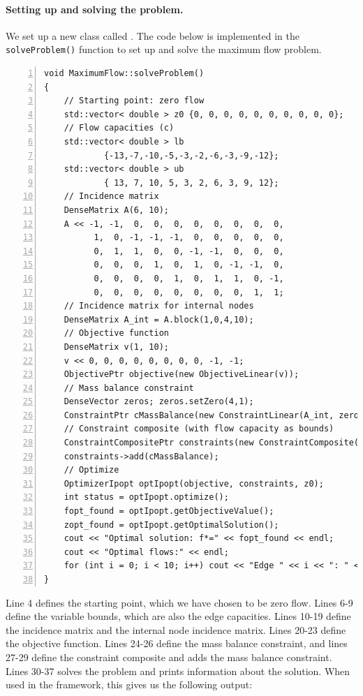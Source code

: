 \paragraph{Setting up and solving the problem.} We set up a new  class called . The code below is implemented in the \texttt{solveProblem()} function to set up and solve the maximum flow problem.
\begin{lstlisting}[numbers=left]
void MaximumFlow::solveProblem()
{
    // Starting point: zero flow
    std::vector< double > z0 {0, 0, 0, 0, 0, 0, 0, 0, 0, 0};
    // Flow capacities (c)
    std::vector< double > lb
    		{-13,-7,-10,-5,-3,-2,-6,-3,-9,-12};
    std::vector< double > ub
    		{ 13, 7, 10, 5, 3, 2, 6, 3, 9, 12};
    // Incidence matrix
    DenseMatrix A(6, 10);
    A << -1, -1,  0,  0,  0,  0,  0,  0,  0,  0,
          1,  0, -1, -1, -1,  0,  0,  0,  0,  0,
          0,  1,  1,  0,  0, -1, -1,  0,  0,  0,
          0,  0,  0,  1,  0,  1,  0, -1, -1,  0,
          0,  0,  0,  0,  1,  0,  1,  1,  0, -1,
          0,  0,  0,  0,  0,  0,  0,  0,  1,  1;
    // Incidence matrix for internal nodes
    DenseMatrix A_int = A.block(1,0,4,10);
    // Objective function
    DenseMatrix v(1, 10);
    v << 0, 0, 0, 0, 0, 0, 0, 0, -1, -1;
    ObjectivePtr objective(new ObjectiveLinear(v));
    // Mass balance constraint
    DenseVector zeros; zeros.setZero(4,1);
    ConstraintPtr cMassBalance(new ConstraintLinear(A_int, zeros, true));
    // Constraint composite (with flow capacity as bounds)
    ConstraintCompositePtr constraints(new ConstraintComposite(10, lb, ub));
    constraints->add(cMassBalance);
    // Optimize
    OptimizerIpopt optIpopt(objective, constraints, z0);
    int status = optIpopt.optimize();
    fopt_found = optIpopt.getObjectiveValue();
    zopt_found = optIpopt.getOptimalSolution();
    cout << "Optimal solution: f*=" << fopt_found << endl;
    cout << "Optimal flows:" << endl;
    for (int i = 0; i < 10; i++) cout << "Edge " << i << ": " << zopt_found.at(i) << endl;
}
\end{lstlisting}
Line 4 defines the starting point, which we have chosen to be zero flow. Lines 6-9 define the variable bounds, which are also the edge capacities. Lines 10-19 define the incidence matrix and the internal node incidence matrix. Lines 20-23 define the objective function. Lines 24-26 define the mass balance constraint, and lines 27-29 define the constraint composite and adds the mass balance constraint. Lines 30-37 solves the problem and prints information about the solution. When used in the  framework, this gives us the following output:
